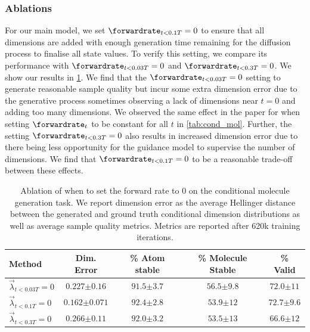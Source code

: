 \subsubsection{Ablations}
For our main model, we set $\forwardrate_{t < 0.1T} = 0$ to ensure that all dimensions are added with enough generation time remaining for the diffusion process to finalise all state values. To verify this setting, we compare its performance with $\forwardrate_{t<0.03T} = 0$ and $\forwardrate_{t<0.3T} = 0$. We show our results in \cref{tab:lowTablation}. We find that the $\forwardrate_{t<0.03T}=0$ setting to generate reasonable sample quality but incur some extra dimension error due to the generative process sometimes observing a lack of dimensions near $t=0$ and adding too many dimensions. We observed the same effect in the paper for when setting $\forwardrate_t$ to be constant for all $t$ in \cref{tab:cond_mol}. Further, the setting $\forwardrate_{t<0.3T}=0$ also results in increased dimension error due to there being less opportunity for the guidance model to supervise the number of dimensions. We find that $\forwardrate_{t<0.1T}=0$ to be a reasonable trade-off between these effects.
\begin{table}[ht]
\centering
\caption{Ablation of when to set the forward rate to $0$ on the conditional molecule generation task. We report dimension error as the average Hellinger distance between the generated and ground truth conditional dimension distributions as well as average sample quality metrics. Metrics are reported after 620k training iterations.}
\begin{tabular}{@{}lcccc@{}}
\toprule
Method & Dim.  Error & \% Atom stable & \% Molecule Stable & \% Valid \\ \midrule
$ \overrightarrow{\lambda}_{t < 0.03T} = 0$ & $0.227 {\scriptstyle \pm 0.16}$ & $91.5 {\scriptstyle \pm 3.7} $  & $56.5 {\scriptstyle \pm 9.8}$ & $72.0 {\scriptstyle \pm 11}$  \\
$ \overrightarrow{\lambda}_{t < 0.1T} = 0$ & $0.162 {\scriptstyle \pm 0.071}$ & $92.4 {\scriptstyle \pm 2.8}$ & $53.9 {\scriptstyle \pm 12}$ & $72.7 {\scriptstyle \pm 9.6}$ \\
$ \overrightarrow{\lambda}_{t < 0.3T} = 0$ & $0.266 {\scriptstyle \pm 0.11}$ & $92.0 {\scriptstyle \pm 3.2}$ & $53.5 {\scriptstyle \pm 13}$ & $66.6 {\scriptstyle \pm 12}$ \\
\bottomrule
\end{tabular}
\label{tab:lowTablation}
\end{table}

